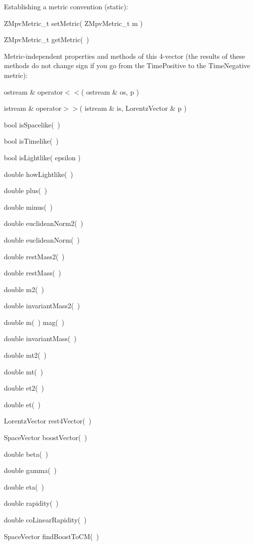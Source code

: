 \noindent
Establishing a metric convention (static):

\begin{shortlist}
  \item ZMpvMetric\_t setMetric( ZMpvMetric\_t m )
  \item ZMpvMetric\_t getMetric(~)
\end{shortlist}

\noindent
Metric-independent properties and methods of this 4-vector
(the results of these methods do not change sign if you go from the
TimePositive to the TimeNegative metric):
\begin{shortlist}
  \item ostream \& operator$<<$( ostream \& os, p )
  \item istream \& operator$>>$( istream \& is, LorentzVector \& p )
  \item bool isSpacelike(~) \see{\ref{eq:wisSl}}
  \item bool isTimelike(~) \see{\ref{eq:wisTl}}
  \item bool isLightlike( epsilon ) \see{\ref{eq:wisLl}}
  \item double howLightlike(~) \see{\ref{eq:whowLl}, \ref{eq:whowLl:2}}
  \item double plus(~)  \see{\ref{eq:wplus}}
  \item double minus(~) \see{\ref{eq:wminus}}
  \item double euclideanNorm2(~)  \see{\ref{eq:wENorm2}}
  \item double euclideanNorm(~)  \see{\ref{eq:wENorm}}
  \item double restMass2(~) \see{\ref{eq:wrestM2}}
  \item double restMass(~) \see{\ref{eq:wrestM}}
  \item double m2(~) \see{\ref{eq:winvMass2}}
  \item double invariantMass2(~) \see{\ref{eq:winvMass2}}
  \item double m(~) \/\/\/ mag(~) \see{\ref{eq:wmag}}
  \item double invariantMass(~) \see{\ref{eq:winvMass}}
  \item double mt2(~) \see{\ref{eq:wmt2}}
  \item double mt(~) \see{\ref{eq:wmt}}
  \item double et2(~) \see{\ref{eq:wet2}}
  \item double et(~) \see{\ref{eq:wet}}
  \item LorentzVector rest4Vector(~) \see{\ref{eq:wrest4V}}
  \item SpaceVector boostVector(~) \see{\ref{boostvector}}
  \item double beta(~) \see{\ref{eq:wbeta}}
  \item double gamma(~) \see{\ref{eq:wgamma}}
  \item double eta(~) \see{\ref{eq:weta}, \ref{eq:weta:2}, \ref{eq:weta:3}}
  \item double rapidity(~) \see{\ref{eq:wrapid}, \ref{eq:wrapid:2}}
  \item double coLinearRapidity(~) \see{\ref{eq:wcoLinRap}, \ref{eq:wcoLinRap:2}}
  \item SpaceVector findBoostToCM(~) \see{\ref{eq:wfindBoost}}
\end{shortlist}

